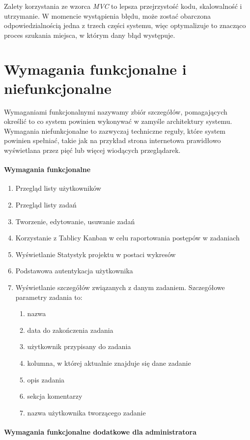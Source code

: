 Zalety korzystania ze wzorca \textit{MVC} to lepsza przejrzystość kodu, skalowalność i utrzymanie. W
momencie wystąpienia błędu, może zostać obarczona odpowiedzialnością jedna z trzech części systemu, więc optymalizuje to znacząco proces szukania miejsca, w którym dany błąd
występuje.  
\clearpage
\section{Wymagania funkcjonalne i niefunkcjonalne}
Wymaganiami funkcjonalnymi nazywamy zbiór szczegółów, pomagających określić to co system powinien wykonywać w zamyśle architektury systemu. Wymagania niefunkcjonalne to zazwyczaj techniczne reguły, które system powinien spełniać, takie jak na przykład strona internetowa prawidłowo wyświetlana przez pięć lub więcej wiodących przeglądarek.
\paragraph{Wymagania funkcjonalne}
\begin{enumerate}
	\item Przegląd listy użytkowników
	\item Przegląd listy zadań 
	\item Tworzenie, edytowanie, usuwanie zadań
	\item Korzystanie z Tablicy Kanban w celu raportowania postępów w zadaniach
	\item Wyświetlanie Statystyk projektu w postaci wykresów
	\item Podstawowa autentykacja użytkownika
	\item Wyświetlanie szczegółów związanych z danym zadaniem. Szczegółowe parametry zadania to:
	\begin{enumerate}[leftmargin=3em]
		\item nazwa
		\item data do zakończenia zadania
		\item użytkownik przypisany do zadania
		\item kolumna, w której aktualnie znajduje się dane zadanie
		\item opis zadania
		\item sekcja komentarzy
		\item nazwa użytkownika tworzącego zadanie
	\end{enumerate}
\end{enumerate}
\paragraph{Wymagania funkcjonalne dodatkowe dla administratora}

